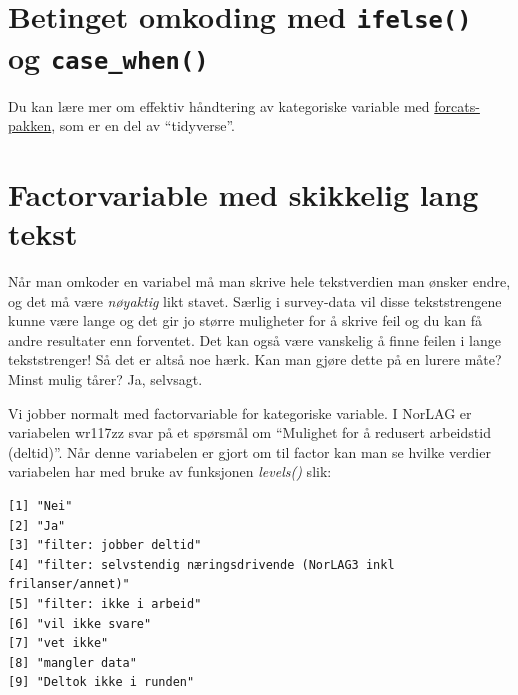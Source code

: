 \documentclass[
  letterpaper,
  DIV=11,
  numbers=noendperiod]{scrreprt}
\newenvironment{Shaded}{\begin{snugshade}}{\end{snugshade}}
\newcommand{\FunctionTok}[1]{\textcolor[rgb]{0.28,0.35,0.67}{#1}}
\newcommand{\NormalTok}[1]{\textcolor[rgb]{0.00,0.23,0.31}{#1}}
\newcommand{\SpecialCharTok}[1]{\textcolor[rgb]{0.37,0.37,0.37}{#1}}
\theoremstyle{definition}
\theoremstyle{remark}
\begin{document}
\hypertarget{betinget-omkoding-med-ifelse-og-case_when}{%
\section{\texorpdfstring{Betinget omkoding med \texttt{ifelse()} og
\texttt{case\_when()}}{Betinget omkoding med ifelse() og case\_when()}}\label{betinget-omkoding-med-ifelse-og-case_when}}

Du kan lære mer om effektiv håndtering av kategoriske variable med
\href{https://forcats.tidyverse.org/articles/forcats.html}{forcats-pakken},
som er en del av ``tidyverse''.

\hypertarget{factorvariable-med-skikkelig-lang-tekst}{%
\section{Factorvariable med skikkelig lang
tekst}\label{factorvariable-med-skikkelig-lang-tekst}}

Når man omkoder en variabel må man skrive hele tekstverdien man ønsker
endre, og det må være \emph{nøyaktig} likt stavet. Særlig i survey-data
vil disse tekststrengene kunne være lange og det gir jo større
muligheter for å skrive feil og du kan få andre resultater enn
forventet. Det kan også være vanskelig å finne feilen i lange
tekststrenger! Så det er altså noe hærk. Kan man gjøre dette på en
lurere måte? Minst mulig tårer? Ja, selvsagt.

Vi jobber normalt med factorvariable for kategoriske variable. I NorLAG
er variabelen wr117zz svar på et spørsmål om ``Mulighet for å redusert
arbeidstid (deltid)''. Når denne variabelen er gjort om til factor kan
man se hvilke verdier variabelen har med bruke av funksjonen
\emph{levels()} slik:

\begin{Shaded}
\end{Shaded}

\begin{verbatim}
[1] "Nei"                                                               
[2] "Ja"                                                                
[3] "filter: jobber deltid"                                             
[4] "filter: selvstendig næringsdrivende (NorLAG3 inkl frilanser/annet)"
[5] "filter: ikke i arbeid"                                             
[6] "vil ikke svare"                                                    
[7] "vet ikke"                                                          
[8] "mangler data"                                                      
[9] "Deltok ikke i runden"                                              
\end{verbatim}
\end{document}
